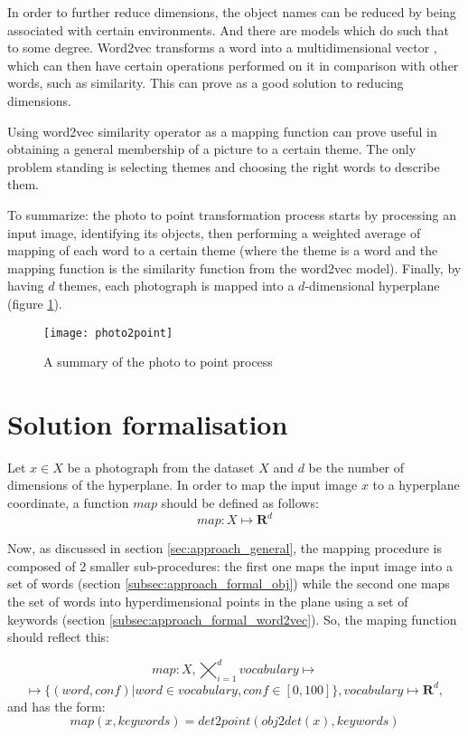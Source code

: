 In order to further reduce dimensions, the object names can be reduced by being associated with certain environments. And there are models which do such that to some degree. Word2vec transforms a word into a multidimensional vector \cite{word2vec}, which can then have certain operations performed on it in comparison with other words, such as similarity. This can prove as a good solution to reducing dimensions.

Using word2vec similarity operator as a mapping function can prove useful in obtaining a general membership of a picture to a certain theme. The only problem standing is selecting themes and choosing the right words to describe them.

To summarize: the photo to point transformation process starts by processing an input image, identifying its objects, then performing a weighted average of mapping of each word to a certain theme (where the theme is a word and the mapping function is the similarity function from the word2vec model). Finally, by having $d$ themes, each photograph is mapped into a $d$-dimensional hyperplane (figure \ref{fig:photo2point}).

\begin{figure}[b!]
\centering
\texttt{[image: photo2point]}
\caption{A summary of the photo to point process}
\label{fig:photo2point}
\end{figure}

\section{Solution formalisation}
\label{sec:approach_formal}

Let $x \in X$ be a photograph from the dataset $X$ and $d$ be the number of dimensions of the hyperplane. In order to map the input image $x$ to a hyperplane coordinate, a function $map$ should be defined as follows:
$$ map : X \mapsto \mathbf{R}^{d} $$

Now, as discussed in section \ref{sec:approach_general}, the mapping procedure is composed of 2 smaller sub-procedures: the first one maps the input image into a set of words (section \ref{subsec:approach_formal_obj}) while the second one maps the set of words into hyperdimensional points in the plane using a set of keywords (section \ref{subsec:approach_formal_word2vec}). So, the maping function  should reflect this:

$$ map : X, \bigtimes_{i=1}^{d}{vocabulary} \mapsto $$ $$ \mapsto \{(word, conf) | word \in vocabulary, conf \in [0, 100]\}, vocabulary \mapsto \mathbf{R}^{d} ,$$
and has the form:
$$ map(x, keywords) = det2point(obj2det(x), keywords) $$

